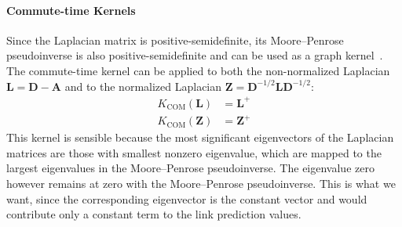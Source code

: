 \documentclass[11pt,a4paper]{book}
\begin{document}
\paragraph{Commute-time Kernels}
Since the Laplacian matrix is positive-semidefinite, 
its Moore--Penrose pseudoinverse is also
positive-semidefinite and can be used as a graph kernel~\cite{b644}. 
The commute-time kernel can be applied to both the non-normalized
Laplacian $\mathbf L = \mathbf D - \mathbf A$ and to the normalized
Laplacian $\mathbf Z = \mathbf D^{-1/2} \mathbf L \mathbf D^{-1/2}$:
\begin{align}
  K_{\mathrm{COM}}(\mathbf L)  &= \mathbf L^+ \label{eq:commute-time-kernel} \\
  K_{\mathrm{COM}}(\mathbf Z) &= \mathbf
  Z^+  \label{eq:normalized-commute-time-kernel} 
\end{align}
This kernel is sensible because the most significant eigenvectors of the
Laplacian matrices are those with smallest nonzero eigenvalue, which
are mapped to the largest eigenvalues in the Moore--Penrose
pseudoinverse.  The eigenvalue zero however remains at zero with the
Moore--Penrose pseudoinverse.  This is what we want, since the
corresponding eigenvector is the constant vector and would contribute
only a constant term to the link prediction values. 
\end{document}
